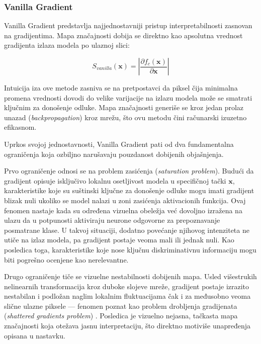 \subsubsection{Vanilla Gradient}

Vanilla Gradient \cite{simonyan2014deep} predstavlja najjednostavniji pristup 
interpretabilnosti zasnovan na gradijentima. Mapa značajnosti dobija se direktno kao 
apsolutna vrednost gradijenta izlaza modela po ulaznoj slici:

\begin{equation}
    S_{vanilla}(\mathbf{x}) = \left|\frac{\partial f_c(\mathbf{x})}{\partial \mathbf{x}}\right|
\end{equation}

Intuicija iza ove metode zasniva se na pretpostavci da piksel čija minimalna promena 
vrednosti dovodi do velike varijacije na izlazu modela može se smatrati ključnim za 
donošenje odluke. Mapa značajnosti generiše se kroz jedan prolaz unazad 
(\textit{backpropagation}) kroz mrežu, što ovu metodu čini računarski izuzetno efikasnom.

Uprkos svojoj jednostavnosti, Vanilla Gradient pati od dva fundamentalna 
ograničenja koja ozbiljno narušavaju pouzdanost dobijenih objašnjenja.

Prvo ograničenje odnosi se na problem zasićenja (\textit{saturation problem}). Budući da gradijent opisuje isključivo lokalnu osetljivost modela u specifičnoj tački $\mathbf{x}$, karakteristike koje su suštinski ključne za donošenje odluke mogu imati gradijent blizak nuli ukoliko se model nalazi u zoni zasićenja aktivacionih funkcija. Ovaj fenomen nastaje kada su određena vizuelna obeležja već dovoljno izražena na ulazu da u potpunosti aktiviraju neurone odgovorne za prepoznavanje posmatrane klase. U takvoj situaciji, dodatno povećanje njihovog intenziteta ne utiče na izlaz modela, pa gradijent postaje veoma mali ili jednak nuli. Kao posledica toga, karakteristike koje nose ključnu diskriminativnu informaciju mogu biti pogrešno ocenjene kao nerelevantne.

Drugo ograničenje tiče se vizuelne nestabilnosti dobijenih mapa. Usled 
višestrukih nelinearnih transformacija kroz duboke slojeve mreže, gradijent postaje 
izrazito nestabilan i podložan naglim lokalnim fluktuacijama čak i za međusobno 
veoma slične ulazne piksele — fenomen poznat kao problem drobljenja gradijenata 
(\textit{shattered gradients problem}) \cite{balduzzi2017shattered}. Posledica je 
vizuelno nejasna, tačkasta mapa značajnosti koja otežava jasnu interpretaciju, 
što direktno motiviše unapređenja opisana u nastavku.


